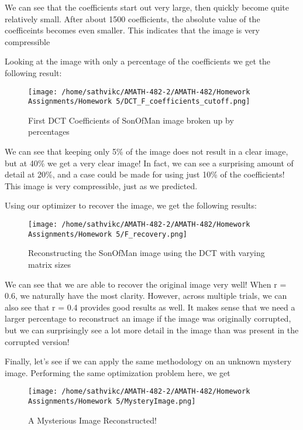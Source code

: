 \documentclass[11pt]{amsart}
\begin{document}
We can see that the coefficients start out very large, then quickly become 
quite relatively small. After about 1500 coefficients, the absolute value 
of the coefficeints becomes even smaller. This indicates that the image is very compressible 

Looking at the image with only a percentage of the coefficients we get the following result: 

\begin{figure}[H]
    \centering
    \texttt{[image: /home/sathvikc/AMATH-482-2/AMATH-482/Homework Assignments/Homework 5/DCT\_F\_coefficients\_cutoff.png]}
    \caption{First DCT Coefficients of SonOfMan image broken up by percentages}
    \label{fig:DCTCoefPercentage}
\end{figure}

We can see that keeping only 5\% of the image 
does not result in a clear image, but at 40\% we get a very clear image! In fact, 
we can see a surprising amount of detail at 20\%, and a case could be made for using just 10\% of the 
coefficients! This image is very compressible, just as we predicted. 

Using our optimizer to recover the image, we get the following results:

\begin{figure}[H]
    \centering
    \texttt{[image: /home/sathvikc/AMATH-482-2/AMATH-482/Homework Assignments/Homework 5/F\_recovery.png]}
    \caption{Reconstructing the SonOfMan image using the DCT with varying matrix sizes}
    \label{fig:Reconstructed Image}
\end{figure}

We can see that we are able to recover the original image very well! When r = 0.6, 
we naturally have the most clarity. However, across multiple trials, we can also see that 
r = 0.4 provides good results as well. It makes sense that we need a larger percentage to 
reconstruct an image if the image was originally corrupted, but we can surprisingly see 
a lot more detail in the image than was present in the corrupted version!

Finally, let's see if we can apply the same 
methodology on an unknown mystery image. Performing the same optimization problem 
here, we get 

\begin{figure}[H]
    \centering
    \texttt{[image: /home/sathvikc/AMATH-482-2/AMATH-482/Homework Assignments/Homework 5/MysteryImage.png]}
    \caption{A Mysterious Image Reconstructed!}
    \label{fig:Nyan_Image}
\end{figure}
\end{document}
